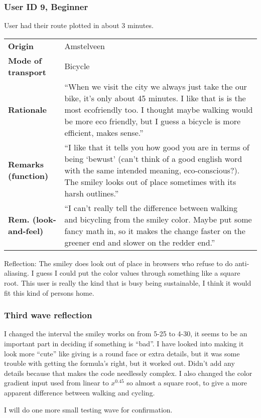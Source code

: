 \documentclass[final,a4paper,11pt]{article}
\newlength{\resulttablecolone}
\newlength{\resulttablecoltwo}
\begin{document}
\subsubsection*{User ID 9, Beginner}
User had their route plotted in about 3 minutes.
\begin{table}[H]
\begin{tabular}{p{\resulttablecolone}|p{\resulttablecoltwo}}
\textbf{Origin} & Amstelveen \\
\textbf{Mode of transport} & Bicycle \\
\textbf{Rationale} & ``When we visit the city we always just take the our bike, it's only about 45 minutes. I like that is is the most ecofriendly too. I thought maybe walking would be more eco friendly, but I guess a bicycle is more efficient, makes sense.'' \\
\textbf{Remarks (function)} & ``I like that it tells you how good you are in terms of being `bewust' (can't think of a good english word with the same intended meaning, eco-conscious?). The smiley looks out of place sometimes with its harsh outlines.'' \\
\textbf{Rem. (look-and-feel)} & ``I can't really tell the difference between walking and bicycling from the smiley color. Maybe put some fancy math in, so it makes the change faster on the greener end and slower on the redder end.'' \\
\end{tabular}
\end{table}
Reflection: The smiley does look out of place in browsers who refuse to do anti-aliasing. I guess I could put the color values through something like a square root. This user is really the kind that is busy being sustainable, I think it would fit this kind of persons home.

\subsubsection*{Third wave reflection}
I changed the interval the smiley works on from 5-25 to 4-30, it seems to be an important part in deciding if something is ``bad''.
 I have looked into making it look more ``cute'' like giving is a round face or extra details, but it was some trouble with getting the formula's right, but it worked out.
 Didn't add any details because that makes the code needlessly complex.
 I also changed the color gradient input used from linear to $x^0.45$ so almost a square root, to give a more apparent difference between walking and cycling.
 
 I will do one more small testing wave for confirmation.
\end{document}
